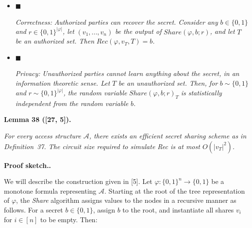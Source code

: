 \documentclass[10pt,a4paper]{article}
\begin{document}
\begin{itemize}


\item[] 
$\blacksquare$ 


\emph{Correctness: }\emph{Authorized parties can recover the secret. Consider any }$b\in\{0,1\}$\emph{ and }$r\in\{0,1\}^{|\varphi|}$\emph{, let }$(v_{1},...,v_{n})$\emph{ be the output of }$Share(\varphi,b;r)$\emph{, and let }$T$\emph{ be an authorized set. Then }$Rec(\varphi,v_{T},T)=b$\emph{.}\par





\item[] 
$\blacksquare$ 


\emph{Privacy: }\emph{Unauthorized parties cannot learn anything about the secret, in an information theoretic sense. Let }$T$\emph{ be an unauthorized set. Then, for }$b\sim\{0,1\}$\emph{ and }$r\sim\{0,1\}^{|\varphi|}$\emph{, the random variable }$Share(\varphi,b;r)_{T}$\emph{ is statistically independent from the random variable }$b$\emph{.}\par





\end{itemize}







\par\medskip\noindent\textbf{
\textbf{Lemma 38}\textbf{ }([27, 5])\textbf{.}
}\par



\emph{For every access structure $\mathcal{A}$, there exists an efficient secret sharing scheme as in Definition 37. The circuit size required to simulate Rec is at most $O(|v_{T}|^{2})$.}\par






\par\medskip\noindent\textbf{Proof sketch..}\par




We will describe the construction given in [5]. Let $\varphi:\{0,1\}^{n}\to\{0,1\}$ be a monotone formula representing $\mathcal{A}$. Starting at the root of the tree representation of $\varphi$, the \emph{Share} algorithm assigns values to the nodes in a recursive manner as follows. For a secret $b\in\{0,1\}$, assign $b$ to the root, and instantiate all shares $v_{i}$ for $i\in[n]$ to be empty. Then:\par
\end{document}
